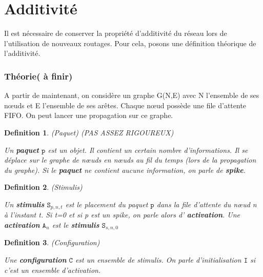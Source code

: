 \documentclass{report}
\newtheorem{mydef}{Definition}
\begin{document}

\part{Additivité}

Il est nécessaire de conserver la propriété d'additivité du réseau lors de l'utilisation de nouveaux routages. Pour cela, posons une définition théorique de l'additivité.

\section{Théorie( à finir)}

A partir de maintenant, on considère un graphe G(N,E) avec N l'ensemble de ses nœuds et E l'ensemble de ses arêtes. Chaque nœud possède une file d'attente FIFO. On peut lancer une propagation sur ce graphe.

\begin{mydef}
(Paquet)
{\color{red}(PAS ASSEZ RIGOUREUX)}

Un \textbf{paquet} $\mathtt{p}$ est un objet. Il contient un certain nombre d'informations. Il se déplace sur le graphe de nœuds en nœuds au fil du temps (lors de la propagation du graphe).
Si le \textbf{paquet} ne contient aucune information, on parle de \textbf{spike}.
\end{mydef}

\begin{mydef}
(Stimulis)

Un \textbf{stimulis} $\mathtt{S}_{p,n,t}$ est le placement du paquet $\mathtt{p}$ dans la file d'attente du nœud n à l'instant t. Si t=0 et si p est un spike, on parle alors d' \textbf{activation}. Une \textbf{activation} $\mathtt{A}_{n}$ est le \textbf{stimulis} $\mathtt{S}_{s,n,0}$
\end{mydef}

\begin{mydef}
(Configuration)

Une \textbf{configuration} $\mathtt{C}$ est un ensemble de stimulis. On parle d'initialisation $\mathtt{I}$ si c'est un ensemble d'activation.
\end{mydef}
\end{document}
